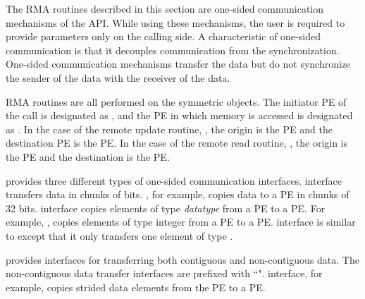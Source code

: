 The \ac{RMA} routines described in this section are one-sided communication
mechanisms of the \openshmem{} \ac{API}. While using these mechanisms, the user
is required to provide parameters only on the calling side. A characteristic of
one-sided communication is that it decouples communication from the
synchronization. One-sided communication mechanisms transfer the data but do not
synchronize the sender of the data with the receiver of the data. 

\openshmem{} \ac{RMA} routines are all performed on the symmetric objects.  The
initiator \ac{PE} of the call is designated as \source{}, and the \ac{PE} in
which memory is accessed is designated as \dest{}. In the case of the remote
update routine, \PUT{}, the origin is the \source{} \ac{PE} and the destination
\ac{PE} is the \dest{} PE. In the case of the remote read routine, \GET{}, the
origin is the \dest{} \ac{PE} and the destination is the \source{} \ac{PE}.

\openshmem{} provides three different types of one-sided communication
interfaces.   interface transfers data in chunks of
bits. , for example, copies data to a \dest{} \ac{PE} in
chunks of 32 bits.  interface copies elements
of type \textit{datatype} from a \source{} \ac{PE} to a \dest{} \ac{PE}.  For
example, , copies elements of type integer from a
\source{} \ac{PE} to a \dest{} \ac{PE}.  
interface is similar to  except that it only
transfers one element of type .

\openshmem{} provides interfaces for transferring both contiguous and
non-contiguous data. The non-contiguous data transfer interfaces are prefixed
with ``".  interface, for example,
copies strided data elements from the \source{} \ac{PE} to a \dest{} \ac{PE}. 
